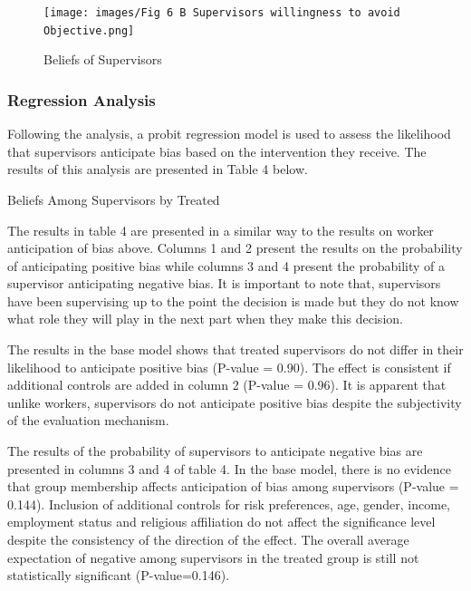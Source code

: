 \begin{figure}[H]
 \captionsetup{justification=raggedright,singlelinecheck=false}
\caption{Beliefs of Supervisors }
\texttt{[image: images/Fig 6 B Supervisors willingness to avoid Objective.png]} 
\end{figure}

\subsubsection{Regression Analysis}

Following the analysis, a probit regression model is used to assess the likelihood that supervisors anticipate bias based on the intervention they receive. The results of this analysis are presented in Table 4 below. 

\begin{table}[H]
 \captionsetup{justification=raggedright,singlelinecheck=false}
    \caption{Beliefs Among Supervisors by Treated }
        
\end{table}

The results in table 4 are presented in a similar way to the results on worker anticipation of bias above. Columns 1 and 2 present the results on the probability of anticipating positive bias while columns 3 and 4 present the probability of a supervisor anticipating negative bias. It is important to note that, supervisors have been supervising up to the point the decision is made but they do not know what role they will play in the next part when they make this decision. 

The results in the base model shows that treated supervisors do not differ in their likelihood to anticipate positive bias (P-value = 0.90). The effect is consistent if additional controls are added in column 2 (P-value = 0.96). It is apparent that unlike workers, supervisors do not anticipate positive bias despite the subjectivity of the evaluation mechanism. 

The results of the probability of supervisors to anticipate negative bias are presented in columns 3 and 4 of table 4. In the base model, there is no evidence that group membership affects anticipation of bias among supervisors (P-value = 0.144). Inclusion of additional controls for risk preferences, age, gender, income, employment status and religious affiliation do not affect the significance level despite the consistency of the direction of the effect. The overall average expectation of negative among supervisors in the treated group is still not statistically significant (P-value=0.146).


